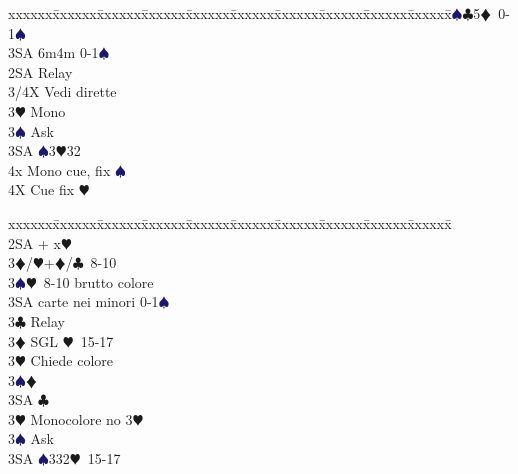 \documentclass[a4paper,italian]{article}
\newcommand{\BC}{\textcolor{OliveGreen}{$\clubsuit$}}
\newcommand{\BD}{\textcolor{RedOrange}{$\vardiamondsuit$}}
\newcommand{\BH}{\textcolor{Red2}{$\varheartsuit${}}}
\newcommand{\BS}{\textcolor{MidnightBlue}{$\spadesuit${}}}
\newenvironment{bidtable}
{\begin{tabbing}

    xxxxxx\=xxxxxx\=xxxxxx\=xxxxxx\=xxxxxx\=xxxxxx\=xxxxxx\=xxxxxx\=xxxxxx\=xxxxxx\=\kill}
{\end{tabbing} }%
\begin{document}
\begin{multicols}{2}
\begin{bidtable}
                                            3\BS {}\BC 5\BD\ 0-1\BS \\
                                            3SA \> 6m4m 0-1\BS \\
                                            2SA \> Relay\+\\
                                            3/4X \> Vedi dirette\\
                                            3\BH \> Mono\+\\
                                            3\BS \> Ask\+\\
                                            3SA \BS 3\BH 32\\
                                            4x \> Mono cue, fix \BS\-\\
                                            4X \> Cue fix \BH \-\-\-\\
                                        \end{bidtable}
                                        \columnbreak
                                        \begin{bidtable}
                                            \+\\
                                            2SA + x\BH \+\\
                                            3\BD/\BH {}+\BD /\BC\ 8-10\\
                                            3\BS {}\BH\ 8-10 brutto colore\\
                                            3SA  carte nei minori 0-1\BS \\
                                            3\BC \> Relay\+\\
                                            3\BD \> SGL \BH\ 15-17\+\\
                                            3\BH \> Chiede colore\+\\
                                            3\BS {}\BD \\
                                            3SA \BC \-\-\\
                                            3\BH \> Monocolore no 3\BH \+\\
                                            3\BS \> Ask\+\\
                                            3SA \BS 332\BH\ 15-17\\

\end{bidtable}
\end{multicols}
\end{document}
